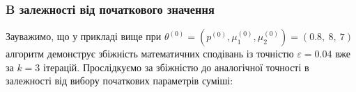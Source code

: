 \documentclass[a4paper,14pt]{extarticle} %
\numberwithin{equation}{section}
\begin{document}
\begin{figure}[H]
\end{figure}

\begin{figure}[H]
\end{figure}

\subsubsection*{B залежності від початкового значення}

Зауважимо, що у прикладі вище при $\theta^{(0)} = (p^{(0)}, \mu_1^{(0)}, \mu_2^{(0)})=(0.8,\ 8,\ 7)$ алгоритм демонструє збіжність математичних сподівань із точністю $\varepsilon=0.04$ вже за $k=3$ ітерацій. Прослідкуємо за збіжністю до аналогічної точності в залежності від вибору початкових параметрів суміші: 
\end{document}
